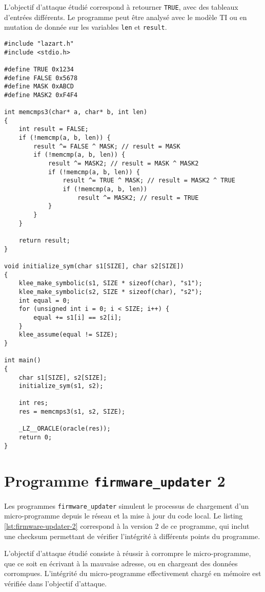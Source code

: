         L'objectif d'attaque étudié correspond à retourner \texttt{TRUE}, avec des tableaux d'entrées différents.
        Le programme peut être analysé avec le modèle \gls{TI} ou en mutation de donnée sur les variables \texttt{len} et \texttt{result}.  

\begin{lstlisting}  
#include "lazart.h"
#include <stdio.h>

#define TRUE 0x1234
#define FALSE 0x5678
#define MASK 0xABCD
#define MASK2 0xF4F4

int memcmps3(char* a, char* b, int len)
{
    int result = FALSE;
    if (!memcmp(a, b, len)) {
        result ^= FALSE ^ MASK; // result = MASK
        if (!memcmp(a, b, len)) {
            result ^= MASK2; // result = MASK ^ MASK2
            if (!memcmp(a, b, len)) {
                result ^= TRUE ^ MASK; // result = MASK2 ^ TRUE
                if (!memcmp(a, b, len))
                    result ^= MASK2; // result = TRUE
            }
        }
    }

    return result;
}

void initialize_sym(char s1[SIZE], char s2[SIZE])
{
    klee_make_symbolic(s1, SIZE * sizeof(char), "s1");
    klee_make_symbolic(s2, SIZE * sizeof(char), "s2");
    int equal = 0;
    for (unsigned int i = 0; i < SIZE; i++) {
        equal += s1[i] == s2[i];
    }
    klee_assume(equal != SIZE);
}

int main()
{
    char s1[SIZE], s2[SIZE];
    initialize_sym(s1, s2);

    int res;
    res = memcmps3(s1, s2, SIZE);
    
    _LZ__ORACLE(oracle(res));
    return 0;
}
\end{lstlisting} 

    \section{Programme \texttt{firmware\_updater} 2}
    \label{annexe:prgm:fu2}
    
        Les programmes \texttt{firmware\_updater} simulent le processus de chargement d'un micro-programme depuis le réseau et la mise à jour du code local.
        Le listing \ref{lst:firmware-updater-2} correspond à la version 2 de ce programme, qui inclut une checksum permettant de vérifier l'intégrité à différents points du programme.
    
        L'objectif d'attaque étudié consiste à réussir à corrompre le micro-programme, que ce soit en écrivant à la mauvaise adresse, ou en chargeant des données corrompues.
        L'intégrité du micro-programme effectivement chargé en mémoire est vérifiée dans l'objectif d'attaque.
    
